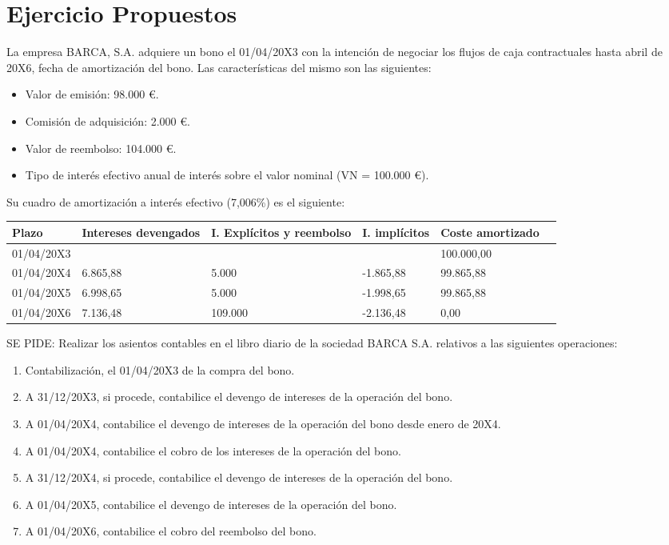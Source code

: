 \section{Ejercicio Propuestos}


La empresa BARCA, S.A. adquiere un bono el 01/04/20X3 con la intención de negociar los flujos de caja contractuales hasta abril de 20X6, fecha de amortización del bono. Las características del mismo son las siguientes:
\begin{itemize}
    \item Valor de emisión: 98.000 €.
    \item Comisión de adquisición: 2.000 €.
    \item Valor de reembolso: 104.000 €.
    \item Tipo de interés efectivo anual de interés sobre el valor nominal (VN = 100.000 €).
\end{itemize}

Su cuadro de amortización a interés efectivo (7,006\%) es el siguiente:
\begin{table}
\centering
\begin{tabular}{|p{2cm}|p{2cm}|p{2cm}|p{2cm}|p{2cm}|p{2cm}}
    \hline
    Plazo & Intereses devengados & I. Explícitos y reembolso & I. implícitos & Coste amortizado \\
    \hline
    01/04/20X3 & & & & 100.000,00 \\
    \hline
    01/04/20X4 & 6.865,88 & 5.000 & -1.865,88 & 99.865,88 \\
    \hline
    01/04/20X5 & 6.998,65 & 5.000 & -1.998,65 & 99.865,88 \\
    \hline
    01/04/20X6 & 7.136,48 & 109.000 & -2.136,48 & 0,00 \\
    \hline
    \end{tabular}
\end{table}


SE PIDE: Realizar los asientos contables en el libro diario de la sociedad BARCA S.A. relativos a las siguientes operaciones:

\begin{enumerate}[label=\alph*)] %
    \item Contabilización, el 01/04/20X3 de la compra del bono.
    \item A 31/12/20X3, si procede, contabilice el devengo de intereses de la operación del bono.
    \item A 01/04/20X4, contabilice el devengo de intereses de la operación del bono desde enero de 20X4.
    \item A 01/04/20X4, contabilice el cobro de los intereses de la operación del bono.
    \item A 31/12/20X4, si procede, contabilice el devengo de intereses de la operación del bono.
    \item A 01/04/20X5, contabilice el devengo de intereses de la operación del bono.
    \item A 01/04/20X6, contabilice el cobro del reembolso del bono.
\end{enumerate}


